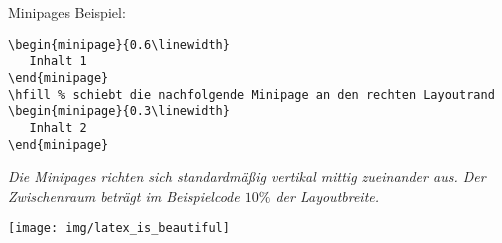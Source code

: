 \begin{frame}[fragile]{Minipages}
Beispiel:
\begin{lstlisting}[style=tex]
\begin{minipage}{0.6\linewidth}
   Inhalt 1
\end{minipage}
\hfill % schiebt die nachfolgende Minipage an den rechten Layoutrand
\begin{minipage}{0.3\linewidth}
   Inhalt 2
\end{minipage}
\end{lstlisting}

\begin{minipage}{0.7\linewidth}
\itshape Die Minipages richten sich standardmäßig vertikal mittig zueinander aus. Der Zwischenraum beträgt im Beispielcode $10\%$ der Layoutbreite.
\end{minipage}
\hfill 
\begin{minipage}{0.25\linewidth}
   \texttt{[image: img/latex\_is\_beautiful]}
\end{minipage}
\end{frame}